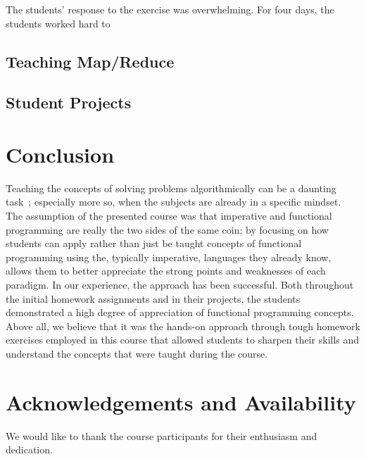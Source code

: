 \documentclass[conference]{IEEEtran}
\begin{document}
The students' response to the exercise was overwhelming. For four days,
the students worked hard to 

\subsection{Teaching Map/Reduce}



\subsection{Student Projects}

\section{Conclusion}

Teaching the concepts of solving problems algorithmically can be a daunting
task~\cite{Futsc06}; especially more so, when the subjects are already in a
specific mindset. The assumption of the presented course was that imperative and
functional programming are really the two sides of the same coin; by focusing on
how students can apply rather than just be taught concepts of functional
programming using the, typically imperative, languages they already know, allows
them to better appreciate the strong points and weaknesses of each paradigm. In
our experience, the approach has been successful. Both throughout the initial
homework assignments and in their projects, the students demonstrated a high
degree of appreciation of functional programming concepts. Above all, we
believe that it was the hands-on approach through tough homework exercises
employed in this course that allowed students to sharpen their skills and
understand the concepts that were taught during the course.

\section*{Acknowledgements and Availability}

We would like to thank the course participants for their enthusiasm and
dedication. 



\end{document}
